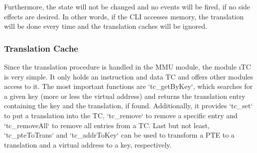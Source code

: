 Furthermore, the state will not be changed and no events will be fired, if no side effects are desired. In other words, if the CLI accesses memory, the translation will be done every time and the translation caches will be ignored.

\subsubsection{Translation Cache}

Since the translation procedure is handled in the MMU module, the module \i{TC} is very simple. It only holds an instruction and data TC and offers other modules access to it. The most important functions are `tc_getByKey`, which searches for a given key (\ie more or less the virtual address) and returns the translation entry containing the key and the translation, if found. Additionally, it provides `tc_set` to put a translation into the TC, `tc_remove` to remove a specific entry and `tc_removeAll` to remove all entries from a TC. Last but not least, `tc_pteToTrans` and `tc_addrToKey` can be used to transform a PTE to a translation and a virtual address to a key, respectively.

